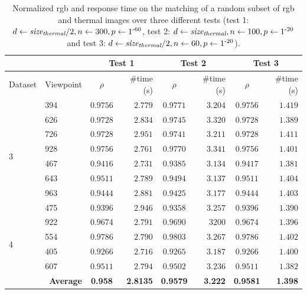 \renewcommand{\arraystretch}{1.15}
\begin{table}[ht]
    \footnotesize
    \caption{Normalized \acrshort{rgb} and response time on the matching of a random subset of \acrshort{rgb} and thermal images over three different tests (test 1: $d \gets \textit{size}_{\textit{thermal}} / 2, n \gets 300, p \gets 1\textsuperscript{-60}$, test 2: $d \gets \textit{size}_{\textit{thermal}}, n \gets 100, p \gets 1\textsuperscript{-20}$ and test 3: $d \gets \textit{size}_{\textit{thermal}} / 2, n \gets 60, p \gets 1\textsuperscript{-20}$).}
    \label{table:thermal_rgb_correlation}
    \begin{tabular}{ll|cr|cr|cr}
        \toprule
        \multicolumn{2}{c}{} & \multicolumn{2}{c}{Test 1} & \multicolumn{2}{c}{Test 2} & \multicolumn{2}{c}{Test 3}\\
        \toprule
        Dataset & Viewpoint & $\rho$ & \#time (\si{\second}) & $\rho$ & \#time (\si{\second}) & $\rho$ & \#time (\si{\second})\\
        \cmidrule{1-8}
        \multirow{8}{*}{3} & 394 & $0.9756$ & $2.779$ & $0.9771$ & $3.204$ & $0.9756$ & $1.419$\\
        & 626 & $0.9728$ & $2.834$ & $0.9745$ & $3.320$ & $0.9728$ & $1.389$\\
        & 726 & $0.9728$ & $2.951$ & $0.9741$ & $3.211$ & $0.9728$ & $1.411$\\ 
        & 928 & $0.9756$ & $2.761$ & $0.9770$ & $3.341$ & $0.9756$ & $1.401$\\
        & 467 & $0.9416$ & $2.731$ & $0.9385$ & $3.134$ & $0.9417$ & $1.381$\\
        & 643 & $0.9511$ & $2.789$ & $0.9494$ & $3.137$ & $0.9511$ & $1.404$\\ 
        & 963 & $0.9444$ & $2.881$ & $0.9425$ & $3.177$ & $0.9444$ & $1.403$\\
        & 475 & $0.9396$ & $2.946$ & $0.9358$ & $3.257$ & $0.9396$ & $1.390$\\
        \cmidrule{1-8}
        \multirow{4}{*}{4} & 922 & $0.9674$ & $2.791$ & $0.9690$ & $3200$ & $0.9674$ & $1.396$\\
        & 554 & $0.9786$ & $2.790$ & $0.9803$ & $3.267$ & $0.9786$ & $1.402$\\
        & 405 & $0.9266$ & $2.716$ & $0.9265$ & $3.187$ & $0.9266$ & $1.400$\\
        & 607 & $0.9511$ & $2.794$ & $0.9502$ & $3.236$ & $0.9511$ & $1.382$\\
        \cmidrule{1-8}
        \multicolumn{2}{r|}{\textbf{Average}} & \textbf{0.958} & \textbf{2.8135} & \textbf{0.9579} & \textbf{3.222} & \textbf{0.9581} & \textbf{1.398}\\
        \bottomrule
    \end{tabular}
    \normalsize
\end{table}
\renewcommand{\arraystretch}{1}

